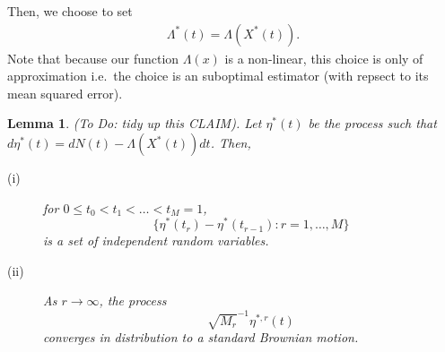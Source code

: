 \documentclass[12pt]{article}%
\newtheorem{lem}{Lemma}
\begin{document}
Then, we choose to set 
\begin{eqnarray}
\Lambda^*(t) = \Lambda(X^*(t)).
\end{eqnarray}
Note that because our function $\Lambda(x)$ is a non-linear, this choice 
is only of approximation i.e.\ the choice is an suboptimal estimator (with repsect to its mean squared error).  
\begin{lem} (To Do: tidy up this CLAIM).  
Let $\eta^*(t)$ be the process such that $d\eta^*(t) = dN(t) - \Lambda(X^*(t)) dt$.  Then, 
\begin{description}
\item[(i)] for $0 \le t_0 < t_1 < \ldots <t_M =1$,
$$
\{ \eta^*(t_r) - \eta^*(t_{r-1}) : r = 1,\ldots, M\} 
$$ 
is a set of independent random variables.
\item[(ii)] As $r\rightarrow \infty$, the process 
$$
\sqrt{M_r}^{-1} \eta^{*,r}(t)
$$
converges in distribution to a standard Brownian motion.
\end{description}
\end{lem}
\end{document}

